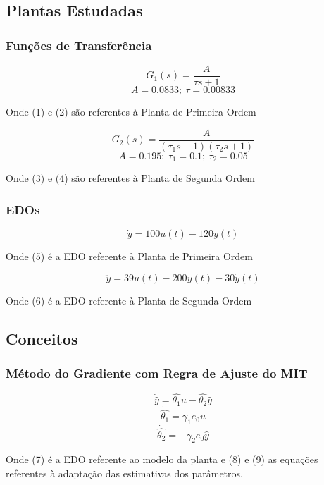 \documentclass[aspectratio=169]{beamer}
\begin{document}
\subsection{Plantas Estudadas}
\begin{frame}
\frametitle{Funções de Transferência}
\begin{equation}
G_1(s)=\frac{A}{\tau s+1}
\end{equation}
\begin{equation}
A=0.0833;~\tau=0.00833
\end{equation}

Onde (1) e (2) são referentes à Planta de Primeira Ordem

\begin{equation}
G_2(s) = \frac{A}{(\tau_1 s + 1)(\tau_2 s + 1)}
\end{equation}
\begin{equation}
A=0.195;~\tau_1=0.1;~\tau_2=0.05
\end{equation}

Onde (3) e (4) são referentes à Planta de Segunda Ordem

\end{frame}
\begin{frame}
\frametitle{EDOs}
\begin{equation}
\dot{y} = 100u(t) - 120y(t)
\end{equation}

Onde (5) é a EDO referente à Planta de Primeira Ordem

\begin{equation}
\ddot{y}= 39u(t) - 200y(t) - 30\dot{y}(t)
\end{equation}

Onde (6) é a EDO referente à Planta de Segunda Ordem 

\end{frame}
\subsection{Conceitos}
\begin{frame}
\frametitle{Método do Gradiente com Regra de Ajuste do MIT}

\begin{equation}
\dot{\hat{y}} = \hat{\theta_1}u-\hat{\theta_2}\hat{y}
\end{equation}
\begin{equation}
\dot{\hat{\theta_1}} = \gamma_1e_0u
\end{equation}
\begin{equation}
\dot{\hat{\theta_2}} = -\gamma_2e_0\hat{y}
\end{equation}

Onde (7) é a EDO referente ao modelo da planta e (8) e (9) as equações referentes à adaptação das estimativas dos parâmetros.

\end{frame}
\end{document}
